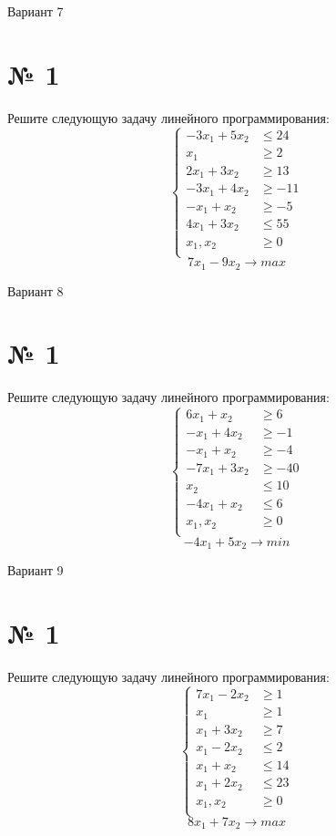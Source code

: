 \documentclass{article}%
\begin{document}
%
\newpage%
\begin{center}%
\begin{Huge}%
Вариант 7%
\end{Huge}%
\end{center}%
\section*{№ 1}%
\label{sec:1}%
Решите следующую задачу линейного программирования: %
\[%
\left\{\begin{aligned}-3x_{1}+5x_{2} & \le24 \\x_{1} & \ge2 \\2x_{1}+3x_{2} & \ge13 \\-3x_{1}+4x_{2} & \ge-11 \\-x_{1}+x_{2} & \ge-5 \\4x_{1}+3x_{2} & \le55 \\x_{1},x_{2} & \ge 0 \\\end{aligned}\right.%
\]%
\[%
7x_{1}-9x_{2}  \to max%
\]

%
\newpage%
\begin{center}%
\begin{Huge}%
Вариант 8%
\end{Huge}%
\end{center}%
\section*{№ 1}%
\label{sec:1}%
Решите следующую задачу линейного программирования: %
\[%
\left\{\begin{aligned}6x_{1}+x_{2} & \ge6 \\-x_{1}+4x_{2} & \ge-1 \\-x_{1}+x_{2} & \ge-4 \\-7x_{1}+3x_{2} & \ge-40 \\x_{2} & \le10 \\-4x_{1}+x_{2} & \le6 \\x_{1},x_{2} & \ge 0 \\\end{aligned}\right.%
\]%
\[%
-4x_{1}+5x_{2}  \to min%
\]

%
\newpage%
\begin{center}%
\begin{Huge}%
Вариант 9%
\end{Huge}%
\end{center}%
\section*{№ 1}%
\label{sec:1}%
Решите следующую задачу линейного программирования: %
\[%
\left\{\begin{aligned}7x_{1}-2x_{2} & \ge1 \\x_{1} & \ge1 \\x_{1}+3x_{2} & \ge7 \\x_{1}-2x_{2} & \le2 \\x_{1}+x_{2} & \le14 \\x_{1}+2x_{2} & \le23 \\x_{1},x_{2} & \ge 0 \\\end{aligned}\right.%
\]%
\[%
8x_{1}+7x_{2}  \to max%
\]
\end{document}
